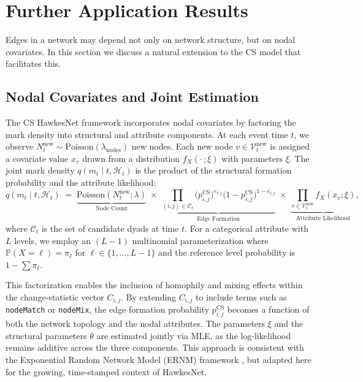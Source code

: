 \documentclass[12pt]{article}
\begin{document}
\section{Further Application Results}

Edges in a network may depend not only on network structure, but on nodal covariates. In this section we discuss a natural extension to the CS model that facilitates this.

\subsection{Nodal Covariates and Joint Estimation}\label{app:gender}

The CS HawkesNet framework incorporates nodal covariates by factoring the mark density into structural and attribute components. At each event time $t$, we observe $N_t^{\text{new}} \sim \text{Poisson}(\lambda_{\text{nodes}})$ new nodes. Each new node $v \in \mathcal{V}_t^{\text{new}}$ is assigned a covariate value $x_v$ drawn from a distribution $f_X(\cdot\,;\xi)$ with parameters $\xi$. The joint mark density $q(m_t \mid t, \mathcal{H}_t)$ is the product of the structural formation probability and the attribute likelihood:
\[
q(m_t \mid t, \mathcal{H}_t) \;=\; \underbrace{\text{Poisson}(N_t^{\text{new}}; \lambda)}_{\text{Node Count}} \;\times\; \underbrace{\prod_{(i,j) \in \mathcal{C}_t} \bigl(p_{i,j}^{\text{CS}}\bigr)^{e_{i,j}} \bigl(1 - p_{i,j}^{\text{CS}}\bigr)^{1-e_{i,j}}}_{\text{Edge Formation}} \;\times\; \underbrace{\prod_{v \in \mathcal{V}_t^{\text{new}}} f_X(x_v; \xi)}_{\text{Attribute Likelihood}},
\]
where $\mathcal{C}_t$ is the set of candidate dyads at time $t$. For a categorical attribute with $L$ levels, we employ an $(L-1)$ multinomial parameterization where $\mathbb{P}(X = \ell) = \pi_\ell$ for $\ell \in \{1, \dots, L-1\}$ and the reference level probability is $1 - \sum \pi_\ell$.

This factorization enables the inclusion of homophily and mixing effects within the change-statistic vector $C_{i,j}$. By extending $C_{i,j}$ to include terms such as \texttt{nodeMatch} or \texttt{nodeMix}, the edge formation probability $p_{i,j}^{\text{CS}}$ becomes a function of both the network topology and the nodal attributes. The parameters $\xi$ and the structural parameters $\theta$ are estimated jointly via MLE, as the log-likelihood remains additive across the three components. This approach is consistent with the Exponential Random Network Model (ERNM) framework \citep{fellows2012, fellows2023ernm}, but adapted here for the growing, time-stamped context of HawkesNet.
\end{document}
